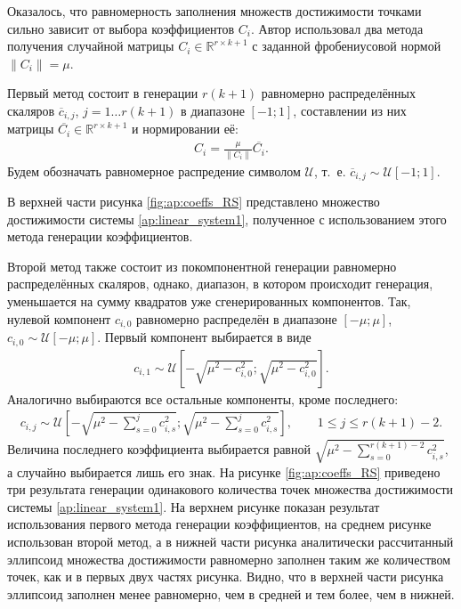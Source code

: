 \documentclass[../main.tex]{subfiles}
\begin{document}
 Оказалось, что равномерность заполнения множеств достижимости точками сильно зависит от выбора коэффициентов $C_i$. 
 Автор использовал два метода получения случайной матрицы $C_i \in \mathbb{R}^{r \times k+1}$ с заданной фробениусовой нормой $ \|C_i\| = \mu$. 
 
 Первый метод состоит в генерации $r (k + 1)$ равномерно распределённых скаляров $ \overline{c}_{i, j}$, $ j = 1\dots r (k + 1)$ в диапазоне $[-1;1] $, составлении из них матрицы $\overline{C_i} \in \mathbb{R}^{r \times k+1}$ и нормировании её:
 \begin{gather*}
 		C_i = \frac{\mu}{\|C_i\|}\overline{C_i}.
 \end{gather*}
 Будем обозначать равномерное распредение символом $\mathcal{U}$, т.~е. $\overline{c}_{i, j} \sim \mathcal{U}[-1;1]$.
 
 В верхней части рисунка \ref{fig:ap:coeffs_RS} представлено множество достижимости системы \eqref{ap:linear_system1}, полученное с использованием этого метода генерации коэффициентов. 
 
 Второй метод также состоит из покомпонентной генерации равномерно распределённых скаляров, однако, диапазон, в котором происходит генерация, уменьшается на сумму квадратов уже сгенерированных компонентов. 
 Так, нулевой компонент $c_{i, 0}$ равномерно распределён в диапазоне $[-\mu; \mu]$, $c_{i, 0} \sim \mathcal{U}[-\mu; \mu]$. 
 Первый компонент выбирается в виде
 \begin{gather*}
 	 c_{i, 1} \sim \mathcal{U}\left[-\sqrt{\mu^2 - c_{i, 0}^2}; \sqrt{\mu^2 - c_{i, 0}^2}\right].
 \end{gather*} 
 Аналогично выбираются все остальные компоненты, кроме последнего:
 \begin{gather*}
 	c_{i, j} \sim \mathcal{U}\left[-\sqrt{\mu^2 - \sum\limits_{s = 0}^j c_{i, s}^2}; \sqrt{\mu^2 - \sum\limits_{s = 0}^j c_{i, s}^2}\right], \qquad 1 \leqslant j \leqslant r(k+1) - 2.
 \end{gather*} 
 Величина последнего коэффициента выбирается равной $\sqrt{\mu^2 - \sum\limits_{s = 0}^{r(k+1) - 2} c_{i, s}^2} $, а случайно выбирается лишь его знак.
 На рисунке \ref{fig:ap:coeffs_RS} приведено три результата генерации одинакового количества точек множества достижимости системы \eqref{ap:linear_system1}.
 На верхнем рисунке показан результат использования первого метода генерации коэффициентов, на среднем рисунке использован второй метод, а в нижней части рисунка аналитически рассчитанный эллипсоид множества достижимости равномерно заполнен таким же количеством точек, как и в первых двух частях рисунка. 
 Видно, что в верхней части рисунка эллипсоид заполнен менее равномерно, чем в средней и тем более, чем в нижней. 
 
\end{document}
